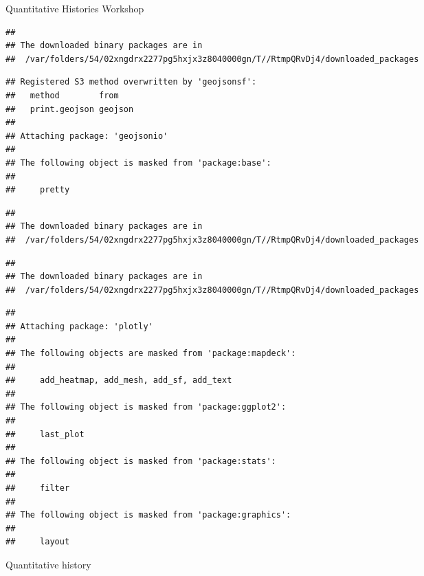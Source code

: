 \documentclass[
  ignorenonframetext,
]{beamer}
\begin{document}
\begin{frame}[fragile]{Quantitative Histories Workshop}
\begin{verbatim}
## 
## The downloaded binary packages are in
##  /var/folders/54/02xngdrx2277pg5hxjx3z8040000gn/T//RtmpQRvDj4/downloaded_packages
\end{verbatim}

\begin{verbatim}
## Registered S3 method overwritten by 'geojsonsf':
##   method        from   
##   print.geojson geojson
## 
## Attaching package: 'geojsonio'
## 
## The following object is masked from 'package:base':
## 
##     pretty
\end{verbatim}

\begin{verbatim}
## 
## The downloaded binary packages are in
##  /var/folders/54/02xngdrx2277pg5hxjx3z8040000gn/T//RtmpQRvDj4/downloaded_packages
\end{verbatim}

\begin{verbatim}
## 
## The downloaded binary packages are in
##  /var/folders/54/02xngdrx2277pg5hxjx3z8040000gn/T//RtmpQRvDj4/downloaded_packages
\end{verbatim}

\begin{verbatim}
## 
## Attaching package: 'plotly'
## 
## The following objects are masked from 'package:mapdeck':
## 
##     add_heatmap, add_mesh, add_sf, add_text
## 
## The following object is masked from 'package:ggplot2':
## 
##     last_plot
## 
## The following object is masked from 'package:stats':
## 
##     filter
## 
## The following object is masked from 'package:graphics':
## 
##     layout
\end{verbatim}

\begin{block}{Quantitative history}
\protect\hypertarget{quantitative-history}{}
\begin{columns}[T]
\begin{column}{0.4\textwidth}
\end{column}


\end{columns}
\end{block}
\end{frame}
\end{document}
